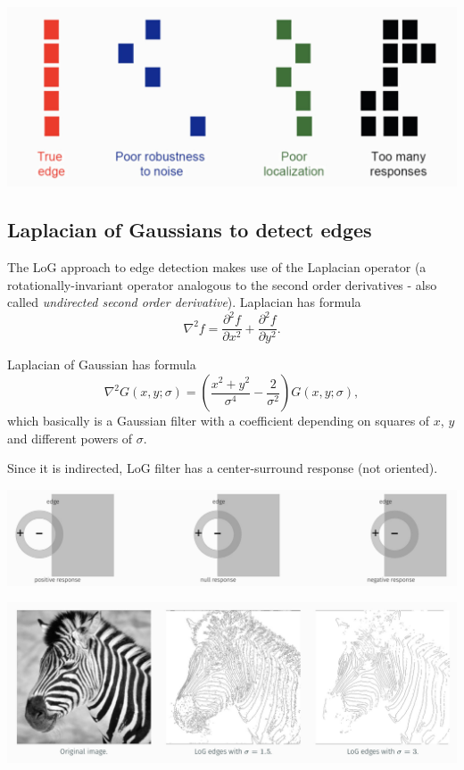 \documentclass[10pt]{report}
\begin{document}
\begin{center}
\includegraphics[width=.9\linewidth]{./pics/det/the-good-edge-detector.jpg}
\end{center}

\subsection{Laplacian of Gaussians to detect edges}
\label{laplacian-of-gaussians-to-detect-edges}
The LoG approach to edge detection makes use of the Laplacian operator
(a rotationally-invariant operator analogous to the second order
derivatives - also called \emph{undirected second order derivative}).
Laplacian has formula
\[\nabla^2 f = \frac{\partial^2 f}{\partial x^2} + \frac{\partial^2 f}{\partial y^2}.\]

Laplacian of Gaussian has formula
\[\nabla^2 G (x, y;\sigma) = \left(\frac{x^2 + y^2}{\sigma^4} - \frac{2}{\sigma^2}\right)G(x, y; \sigma),\] which basically is a Gaussian filter with a coefficient depending on squares of \(x\), \(y\) and different powers of \(\sigma\).

Since it is indirected, LoG filter has a center-surround response (not
oriented).

\begin{center}
\includegraphics[width=.9\linewidth]{./pics/det/log-edge-detection.jpg}
\end{center}

\begin{center}
\includegraphics[width=.9\linewidth]{./pics/det/zebra-1.jpg}
\end{center}
\end{document}
